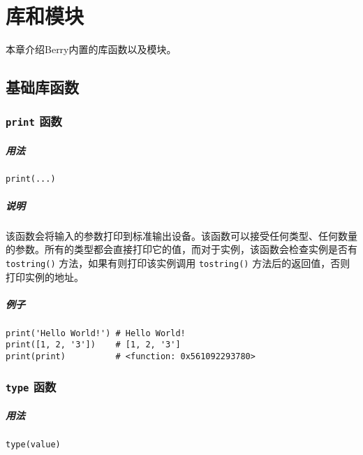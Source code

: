 \chapter{库和模块}

本章介绍Berry内置的库函数以及模块。

\section{基础库函数}

\subsection{\texttt{print} 函数}

\paragraph{用法}
\begin{lstlisting}[language=berry, numbers=none]
print(...)
\end{lstlisting}

\paragraph{说明}
该函数会将输入的参数打印到标准输出设备。该函数可以接受任何类型、任何数量的参数。所有的类型都会直接打印它的值，而对于实例，该函数会检查实例是否有 \texttt{tostring()} 方法，如果有则打印该实例调用 \texttt{tostring()} 方法后的返回值，否则打印实例的地址。

\paragraph{例子}
\begin{lstlisting}[language=berry, numbers=none]
print('Hello World!') # Hello World!
print([1, 2, '3'])    # [1, 2, '3']
print(print)          # <function: 0x561092293780>
\end{lstlisting}

\subsection{\texttt{type} 函数}

\paragraph{用法}
\begin{lstlisting}[language=berry, numbers=none]
type(value)
\end{lstlisting}

